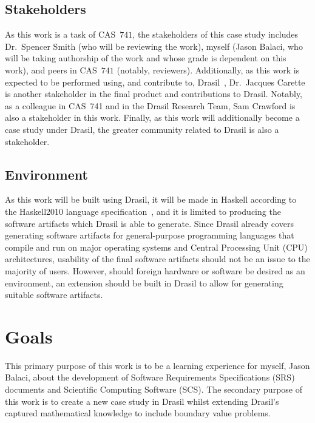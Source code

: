 \documentclass{article}
\begin{document}
\subsection{Stakeholders}
\label{problem-statement:stakeholders}

As this work is a task of CAS\ $741$, the stakeholders of this case study
includes Dr.\ Spencer Smith (who will be reviewing the work), myself (Jason
Balaci, who will be taking authorship of the work and whose grade is dependent
on this work), and peers in CAS\ $741$ (notably, reviewers). Additionally, as
this work is expected to be performed using, and contribute to, Drasil\
\cite{Drasil2023}, Dr.\ Jacques Carette is another stakeholder in the final
product and contributions to Drasil. Notably, as a colleague in CAS\ 741 and in
the Drasil Research Team, Sam Crawford is also a stakeholder in this work.
Finally, as this work will additionally become a case study under Drasil, the
greater community related to Drasil is also a stakeholder.

\subsection{Environment}
\label{problem-statement:environment}

As this work will be built using Drasil, it will be made in Haskell according to
the Haskell2010 language specification\ \cite{Haskell2010}, and it is limited to
producing the software artifacts which Drasil is able to generate. Since Drasil
already covers generating software artifacts for general-purpose programming
languages that compile and run on major operating systems and Central Processing
Unit (CPU) architectures, usability of the final software artifacts should not
be an issue to the majority of users. However, should foreign hardware or
software be desired as an environment, an extension should be built in Drasil to
allow for generating suitable software artifacts.

\section{Goals}
\label{goals}

This primary purpose of this work is to be a learning experience for myself,
Jason Balaci, about the development of Software Requirements Specifications
(SRS) documents and Scientific Computing Software (SCS). The secondary purpose
of this work is to create a new case study in Drasil whilst extending Drasil's
captured mathematical knowledge to include boundary value problems.
\end{document}
